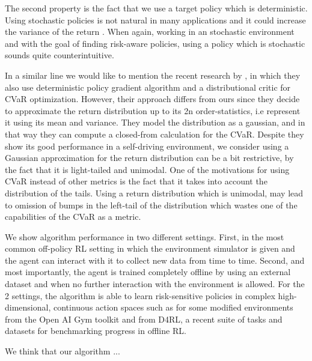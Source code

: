The second property is the fact that we use a target policy which is deterministic.
Using stochastic policies is not natural in many applications and it
could increase the variance of the return \citet{Taleghan2018}.
When again, working in an stochastic 
environment and with the goal of finding risk-aware policies, using a policy which is stochastic 
sounds quite counterintuitive.

In a similar line we would like to mention the recent research by \citet{tang2020}, in
which they also use deterministic policy gradient algorithm and a distributional critic for
CVaR optimization. However, their approach differs from ours since they decide to
approximate the return distribution up to its 2n order-statistics,
i.e represent it using its mean and variance. They model the distribution as a gaussian, and in
that way they can compute a closed-from calculation for the CVaR.
Despite they show its good performance in a self-driving environment, we consider
using a Gaussian approximation for the return distribution can be a bit restrictive, by the fact that it is light-tailed and
unimodal. 
One of the motivations for using CVaR instead of other metrics is the fact that it takes into account
the distribution of the tails. Using a  return distribution which is unimodal, may lead to omission of
bumps in the left-tail of the distribution which wastes one of the capabilities of the CVaR as a metric.


We show algorithm performance in two different settings.
First, in the most common off-policy RL setting in which the environment simulator is given and
the agent can interact with it to collect new data from time to time.
Second, and most importantly, the agent is trained completely offline by using an external
dataset and when no further interaction with the environment is allowed.
For the 2 settings, the algorithm is able to learn risk-sensitive policies in
complex high-dimensional, continuous action spaces
such as for some modified environments from the Open AI Gym toolkit and from D4RL,
a recent suite of tasks and datasets for benchmarking progress in offline RL.

We think that our algorithm ... 